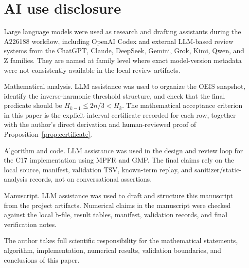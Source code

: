\documentclass[11pt]{article}
\theoremstyle{definition}
\theoremstyle{remark}
\begin{document}
\section*{AI use disclosure}

Large language models were used as research and drafting assistants during the
A226188 workflow, including OpenAI Codex and external LLM-based review systems
from the ChatGPT, Claude, DeepSeek, Gemini, Grok, Kimi, Qwen, and Z families.
They are named at family level where exact model-version metadata were not
consistently available in the local review artifacts.

Mathematical analysis.  LLM assistance was used to organize the OEIS snapshot,
identify the inverse-harmonic threshold structure, and check that the final
predicate should be \(H_{k-1}\leq 2n/3 < H_k\).  The mathematical acceptance
criterion in this paper is the explicit interval certificate recorded for each
row, together with the author's direct derivation and human-reviewed proof of
Proposition~\ref{prop:certificate}.

Algorithm and code.  LLM assistance was used in the design and review loop for
the C17 implementation using MPFR and GMP.  The final claims rely on the local
source, manifest, validation TSV, known-term replay, and
sanitizer/static-analysis records, not on conversational assertions.

Manuscript.  LLM assistance was used to draft and structure this manuscript
from the project artifacts.  Numerical claims in the manuscript were
checked against the local b-file, result tables, manifest, validation records,
and final verification notes.

The author takes full scientific responsibility for the mathematical
statements, algorithm, implementation, numerical results, validation
boundaries, and conclusions of this paper.
\end{document}
